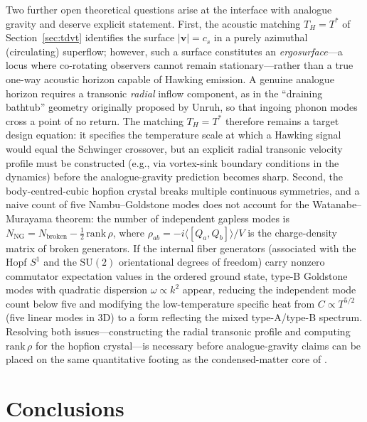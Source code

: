 \documentclass[11pt,letterpaper]{article}
\begin{document}
Two further open theoretical questions arise at the interface with analogue gravity and deserve explicit statement. First, the acoustic matching $T_H = T^*$ of Section~\ref{sec:tdvt} identifies the surface $|\mathbf{v}| = c_s$ in a purely azimuthal (circulating) superflow; however, such a surface constitutes an \textit{ergosurface}---a locus where co-rotating observers cannot remain stationary---rather than a true one-way acoustic horizon capable of Hawking emission\cite{Barcelo2005}. A genuine analogue horizon requires a transonic \textit{radial} inflow component, as in the ``draining bathtub'' geometry originally proposed by Unruh, so that ingoing phonon modes cross a point of no return. The matching $T_H = T^*$ therefore remains a target design equation: it specifies the temperature scale at which a Hawking signal would equal the Schwinger crossover, but an explicit radial transonic velocity profile must be constructed (e.g., via vortex-sink boundary conditions in the \TQGL{} dynamics) before the analogue-gravity prediction becomes sharp. Second, the body-centred-cubic hopfion crystal breaks multiple continuous symmetries, and a naive count of five Nambu--Goldstone modes does not account for the Watanabe--Murayama theorem\cite{WatanabeMurayama2012}: the number of independent gapless modes is $N_{\mathrm{NG}} = N_{\mathrm{broken}} - \tfrac{1}{2}\,\mathrm{rank}\,\rho$, where $\rho_{ab} = -i\langle [Q_a, Q_b]\rangle / V$ is the charge-density matrix of broken generators. If the internal fiber generators (associated with the Hopf $S^1$ and the $\mathrm{SU}(2)$ orientational degrees of freedom) carry nonzero commutator expectation values in the ordered ground state, type-B Goldstone modes with quadratic dispersion $\omega \propto k^2$ appear, reducing the independent mode count below five and modifying the low-temperature specific heat from $C \propto T^{5/2}$ (five linear modes in 3D) to a form reflecting the mixed type-A/type-B spectrum. Resolving both issues---constructing the radial transonic profile and computing $\mathrm{rank}\,\rho$ for the hopfion crystal---is necessary before analogue-gravity claims can be placed on the same quantitative footing as the condensed-matter core of \QVC{}.

\section{Conclusions}
\label{sec:conclusions}
\end{document}
